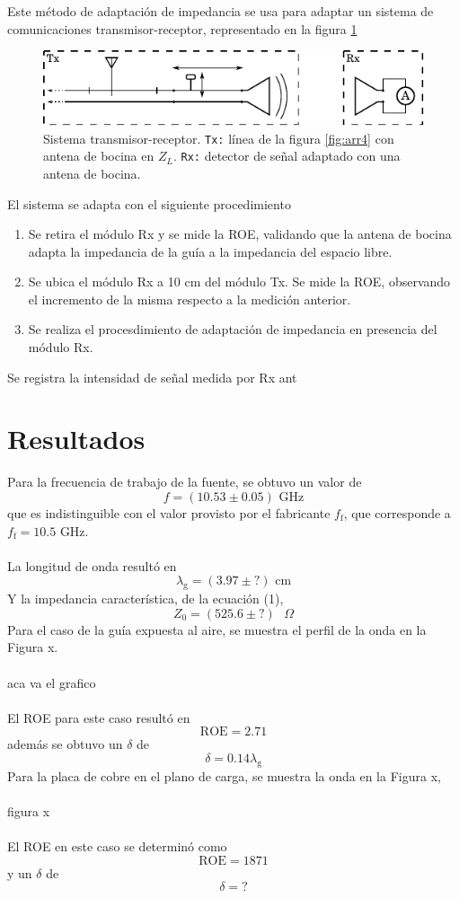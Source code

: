 \documentclass[11pt,a4paper]{article}
\begin{document}
\begin{multicols}{2}
Este método de adaptación de impedancia se usa para adaptar un sistema de comunicaciones transmisor-receptor, representado en la figura \ref{fig:sistema}

\begin{figure}[H]
    \centering
    \includegraphics[width=\linewidth]{Images/sistema.pdf}
    \caption{Sistema transmisor-receptor.
    \texttt{Tx:} línea de la figura \ref{fig:arr4} con antena de bocina en $Z_L$. 
    \texttt{Rx:} detector de señal adaptado con una antena de bocina.}
    \label{fig:sistema}
\end{figure}

El sistema se adapta con el siguiente procedimiento
\begin{enumerate}
    \item Se retira el módulo Rx y se mide la ROE, validando que la antena de bocina adapta la impedancia de la guía a la impedancia del espacio libre.
    \item Se ubica el módulo Rx a 10 cm del módulo Tx. Se mide la ROE, observando el incremento de la misma respecto a la medición anterior.
    \item Se realiza el procesdimiento de adaptación de impedancia en presencia del módulo Rx.
\end{enumerate}

Se registra la intensidad de señal medida por Rx ant

\section{Resultados}
Para la frecuencia de trabajo de la fuente, se obtuvo un valor de 
$$
f = (10.53 \pm 0.05) \text{ GHz}
$$
que es indistinguible con el valor provisto por el fabricante $f_\text{f}$, que corresponde a $f_\text{f}=10.5$ GHz. \\ \\
La longitud de onda resultó en
$$
\lambda_\text{g} = (3.97 \pm ?) \text{ cm} 
$$
Y la impedancia característica, de la ecuación (1),
$$
Z_0 = (525.6 \pm ?) \text{ } \Omega
$$
Para el caso de la guía expuesta al aire, se muestra el perfil de la onda en la Figura x. \\ \\ 
aca va el grafico \\ \\
El ROE para este caso resultó en
$$
\text{ROE} = 2.71
$$
además se obtuvo un $\delta$ de
$$
\delta = 0.14 \lambda_\text{g}
$$
Para la placa de cobre en el plano de carga, se muestra la onda en la Figura x, \\ \\
figura x \\ \\
El ROE en este caso se determinó como
$$
\text{ROE} = 1871 
$$
y un $\delta$ de 
$$
\delta = ?
$$

\end{multicols}
\end{document}
